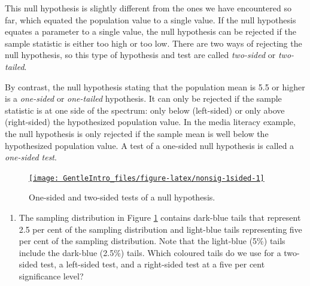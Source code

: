 \documentclass[a4paper]{book}
\providecommand{\tightlist}{%
  \setlength{\itemsep}{0pt}\setlength{\parskip}{0pt}}
\theoremstyle{definition}
\theoremstyle{definition}
\theoremstyle{definition}
\theoremstyle{remark}
\begin{document}
This null hypothesis is slightly different from the ones we have
encountered so far, which equated the population value to a single
value. If the null hypothesis equates a parameter to a single value, the
null hypothesis can be rejected if the sample statistic is either too
high or too low. There are two ways of rejecting the null hypothesis, so
this type of hypothesis and test are called \emph{two-sided} or
\emph{two-tailed}.

By contrast, the null hypothesis stating that the population mean is 5.5
or higher is a \emph{one-sided} or \emph{one-tailed} hypothesis. It can
only be rejected if the sample statistic is at one side of the spectrum:
only below (left-sided) or only above (right-sided) the hypothesized
population value. In the media literacy example, the null hypothesis is
only rejected if the sample mean is well below the hypothesized
population value. A test of a one-sided null hypothesis is called a
\emph{one-sided test}.

\begin{figure}[H]
\href{http://82.196.4.233:3838/apps/nonsig-1sided/}{\texttt{[image: GentleIntro\_files/figure-latex/nonsig-1sided-1]} }\caption{One-sided and two-sided tests of a null hypothesis.}\label{fig:nonsig-1sided}
\end{figure}

\begin{enumerate}
\def\labelenumi{\arabic{enumi}.}
\tightlist
\item
  The sampling distribution in Figure \ref{fig:nonsig-1sided} contains
  dark-blue tails that represent 2.5 per cent of the sampling
  distribution and light-blue tails representing five per cent of the
  sampling distribution. Note that the light-blue (5\%) tails include
  the dark-blue (2.5\%) tails. Which coloured tails do we use for a
  two-sided test, a left-sided test, and a right-sided test at a five
  per cent significance level?
\end{enumerate}
\end{document}
